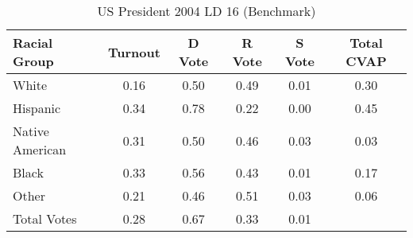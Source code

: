\begin{table}[htb]
\begin{center}
\caption{US President 2004 LD 16 (Benchmark)}
\label{pres04_cvap_ld_16_benchmark}
\begin{tabular}{lccccc}
  \hline
Racial Group & Turnout & D Vote & R Vote & S Vote & Total CVAP \\ 
  \hline
White & 0.16 & 0.50 & 0.49 & 0.01 & 0.30 \\ 
  Hispanic & 0.34 & 0.78 & 0.22 & 0.00 & 0.45 \\ 
  Native American & 0.31 & 0.50 & 0.46 & 0.03 & 0.03 \\ 
  Black & 0.33 & 0.56 & 0.43 & 0.01 & 0.17 \\ 
  Other & 0.21 & 0.46 & 0.51 & 0.03 & 0.06 \\ 
  Total Votes & 0.28 & 0.67 & 0.33 & 0.01 &  \\ 
   \hline
\end{tabular}
\end{center}
\end{table}
